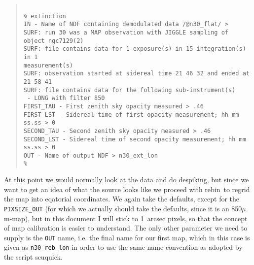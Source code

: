 \documentclass[twoside,11pt]{article}
\newenvironment{myquote}{\begin{quote}\begin{small}}{\end{small}\end{quote}}
\newcommand{\task}[1]{\textsf{#1}}
\newcommand{\param}[1]{\texttt{#1}}
\newcommand{\rebin}{\xref{\task{rebin}}{sun216}{REBIN}}
\newcommand{\scuquick}{\xref{\task{scuquick}}{sun216}{SCUQUICK}}
\newcommand{\xref}[3]{#1}
\begin{document}
\begin{myquote} \begin{verbatim}

% extinction
IN - Name of NDF containing demodulated data /@n30_flat/ > 
SURF: run 30 was a MAP observation with JIGGLE sampling of object ngc7129(2)
SURF: file contains data for 1 exposure(s) in 15 integration(s) in 1
measurement(s)
SURF: observation started at sidereal time 21 46 32 and ended at 21 58 41
SURF: file contains data for the following sub-instrument(s)
 - LONG with filter 850
FIRST_TAU - First zenith sky opacity measured > .46
FIRST_LST - Sidereal time of first opacity measurement; hh mm ss.ss > 0
SECOND_TAU - Second zenith sky opacity measured > .46
SECOND_LST - Sidereal time of second opacity measurement; hh mm ss.ss > 0
OUT - Name of output NDF > n30_ext_lon
% 
\end{verbatim} \end{myquote}

At this point we would normally look at the data and do despiking, but
since we want to get an idea of what the source looks like we proceed with
\rebin\ to regrid the map into eqatorial coordinates. We again take
the defaults, except for the \param{PIXSIZE\_OUT} (for which we actually should
take the defaults, since it is an 850$\mu$m-map), but in this document
I will stick to 1~arcsec pixels, so that the concept of map calibration is
easier to understand. The only other parameter we need to supply is
the \param{OUT} name, i.e. the final name for our first map, which in this case
is given as \texttt{n30\_reb\_lon} in order to use the same name convention as
adopted by the script \scuquick.
\end{document}
